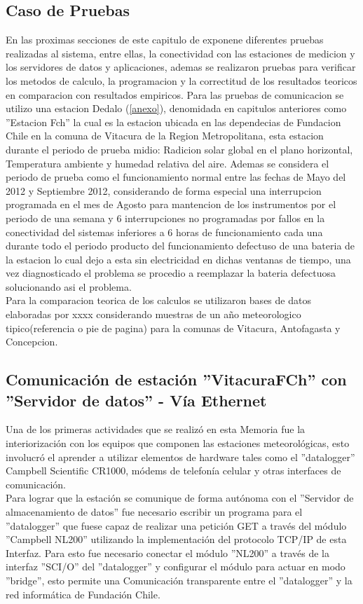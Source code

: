 \subsection{Caso de Pruebas}
En las proximas secciones de este capitulo de exponene diferentes pruebas realizadas al sistema, entre ellas, la conectividad con las estaciones de medicion y los servidores de datos y aplicaciones, ademas se realizaron pruebas para verificar los metodos de calculo, la programacion y la correctitud de los resultados teoricos en comparacion con resultados empiricos. Para las pruebas de comunicacion se utilizo una estacion Dedalo (\ref{anexo}), denomidada en capitulos anteriores como ''Estacion Fch'' la cual es la estacion ubicada en las dependecias de Fundacion Chile en la comuna de Vitacura de la Region Metropolitana, esta estacion durante el periodo de prueba midio: Radicion solar global en el plano horizontal, Temperatura ambiente y humedad relativa del aire. Ademas se considera el periodo de prueba como el funcionamiento normal entre las fechas de Mayo del 2012 y Septiembre 2012, considerando de forma especial una interrupcion programada en el mes de Agosto para mantencion de los instrumentos por el periodo de una semana y 6 interrupciones no programadas por fallos en la conectividad del sistemas inferiores a 6 horas de funcionamiento cada una durante todo el periodo producto del funcionamiento defectuso de una bateria de la estacion lo cual dejo a esta sin electricidad en dichas ventanas de tiempo, una vez diagnosticado el problema se procedio a reemplazar la bateria defectuosa solucionando asi el problema.\\
Para la comparacion teorica de los calculos se utilizaron bases de datos elaboradas por xxxx considerando muestras de un año meteorologico tipico(referencia o pie de pagina) para la comunas de Vitacura, Antofagasta y Concepcion.  
 
\subsection{Comunicación de estación ''VitacuraFCh'' con ''Servidor de datos'' - Vía Ethernet}
Una de los primeras actividades que se realizó en esta Memoria fue la interiorización con los equipos que componen las estaciones meteorológicas, esto involucró el aprender a utilizar elementos de hardware tales como el ''datalogger'' Campbell Scientific CR1000, módems de telefonía celular y otras interfaces de comunicación.\\
Para lograr que la estación se comunique de forma autónoma con el ''Servidor de almacenamiento de datos'' fue necesario escribir un programa para el ''datalogger'' que fuese capaz de realizar una petición GET a través del módulo ''Campbell NL200'' utilizando la implementación del protocolo TCP/IP de esta Interfaz.
Para esto fue necesario conectar el módulo ''NL200'' a través de la interfaz ''SCI/O'' del ''datalogger'' y configurar el módulo para actuar en modo ''bridge'', esto permite una Comunicación transparente entre el ''datalogger'' y la red informática de Fundación Chile.

